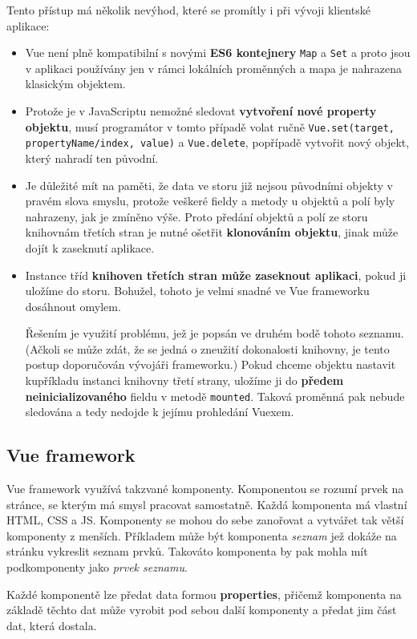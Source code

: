 Tento přístup má několik nevýhod, které se promítly i při vývoji klientské aplikace:
\begin{itemize}
  \item Vue není plně kompatibilní s novými \textbf{ES6 kontejnery} \texttt{Map} a \texttt{Set} a proto jsou v aplikaci používány jen v rámci lokálních proměnných a mapa je nahrazena klasickým objektem.
  \item Protože je v JavaScriptu nemožné sledovat \textbf{vytvoření nové property objektu}, musí programátor v tomto případě volat ručně \texttt{Vue.set(target, propertyName/index, value)} a \texttt{Vue.delete}, popřípadě vytvořit nový objekt, který nahradí ten původní.
  \item Je důležité mít na paměti, že data ve storu již nejsou původními objekty v pravém slova smyslu, protože veškeré fieldy a metody u objektů a polí byly nahrazeny, jak je zmíněno výše. Proto předání objektů a polí ze storu knihovnám třetích stran je nutné ošetřit \textbf{klonováním objektu}, jinak může dojít k zaseknutí aplikace.
  \item Instance tříd \textbf{knihoven třetích stran může zaseknout aplikaci}, pokud ji uložíme do storu. Bohužel, tohoto je velmi snadné ve Vue frameworku dosáhnout omylem.

  Řešením je využití problému, jež je popsán ve druhém bodě tohoto seznamu. (Ačkoli se může zdát, že se jedná o zneužití dokonalosti knihovny, je tento postup doporučován vývojáři frameworku.) Pokud chceme objektu nastavit kupříkladu instanci knihovny třetí strany, uložíme ji do \textbf{předem neinicializovaného} fieldu v metodě \texttt{mounted}. Taková proměnná pak nebude sledována a tedy nedojde k jejímu prohledání Vuexem.
\end{itemize}

\subsection{Vue framework}
Vue framework využívá takzvané komponenty. Komponentou se rozumí prvek na stránce, se kterým má smysl pracovat samostatně. Každá komponenta má vlastní HTML, CSS a JS. Komponenty se mohou do sebe zanořovat a vytvářet tak větší komponenty z menších. Příkladem může být komponenta \textit{seznam} jež dokáže na stránku vykreslit seznam prvků. Takováto komponenta by pak mohla mít podkomponenty jako \textit{prvek seznamu}.

Každé komponentě lze předat data formou \textbf{properties}, přičemž komponenta na základě těchto dat může vyrobit pod sebou další komponenty a předat jim část dat, která dostala.

